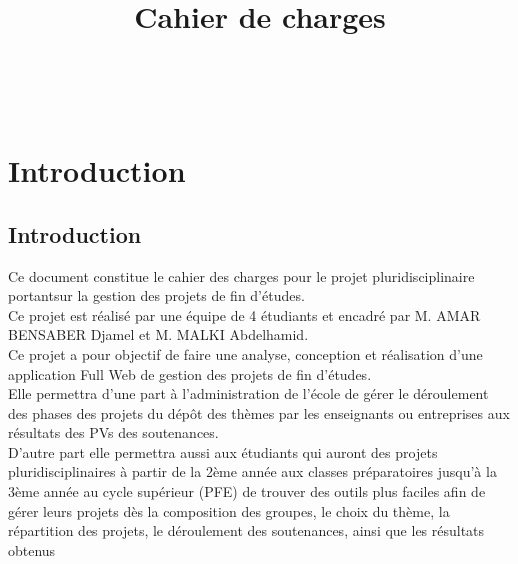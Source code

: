 \documentclass[11pt,fleqn]{book} %
\begin{document}
\title{Cahier de charges}

\begingroup
{}
\endgroup


\newpage
~\vfill
\thispagestyle{empty}




\pagestyle{empty} %

\tableofcontents %


\pagestyle{fancy} %



\chapter{Introduction}
\section{Introduction}

Ce document constitue le cahier des charges pour le projet pluridisciplinaire portantsur la gestion des projets de fin d’études. \\
Ce projet est réalisé par une équipe de 4 étudiants et encadré par M. AMAR 
BENSABER Djamel et M. MALKI Abdelhamid. \\
Ce projet a pour objectif de faire une analyse, conception et réalisation d’une
application Full Web de gestion des projets de fin d’études. \\
Elle permettra d’une part à l’administration de l’école de gérer le déroulement des phases des projets du dépôt des thèmes par les enseignants ou entreprises aux résultats des PVs des soutenances.\\
D’autre part elle permettra aussi aux étudiants qui auront des projets 
pluridisciplinaires à partir de la 2ème année aux classes préparatoires jusqu’à la 3ème année au cycle supérieur (PFE) de trouver des outils plus faciles afin de gérer leurs projets dès la composition des groupes, le choix du thème, la répartition des projets, le déroulement des soutenances, ainsi que les résultats obtenus\\
\end{document}
